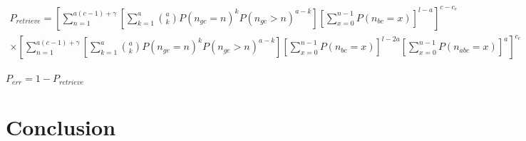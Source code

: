 \documentclass[english,11pt,twocolumn]{article}
\theoremstyle{definition}
\begin{document}
	
	
	\begin{align*}
	P_{retrieve} = \left [ \sum_{n = 1}^{a(c-1) + \gamma} \left [ \sum_{k = 1}^{a} { a \choose k }   P(n_{gc} = n)^k P(n_{gc} > n)^{a-k} \right ]\left [ \sum_{x=0}^{n-1} P(n_{bc} = x) \right]^{l-a} \right ]^{c - c_e} \\ \times \left [ \sum_{n = 1}^{a(c-1) +\gamma} \left[ \sum_{k = 1}^a { a \choose k } P(n_{ge} = n)^k P(n_{ge} > n)^{a-k} \right ] \left [ \sum_{x=0}^{n-1} P(n_{bc} = x) \right]^{l-2a} \left [ \sum_{x=0}^{n-1} P(n_{abc} = x) \right]^a \right ]^{c_e}
	\end{align*}
	
	$P_{err} = 1 - P_{retrieve}$
	


	\section{Conclusion}	
	
	
	\nocite{*}
         
\end{document}
